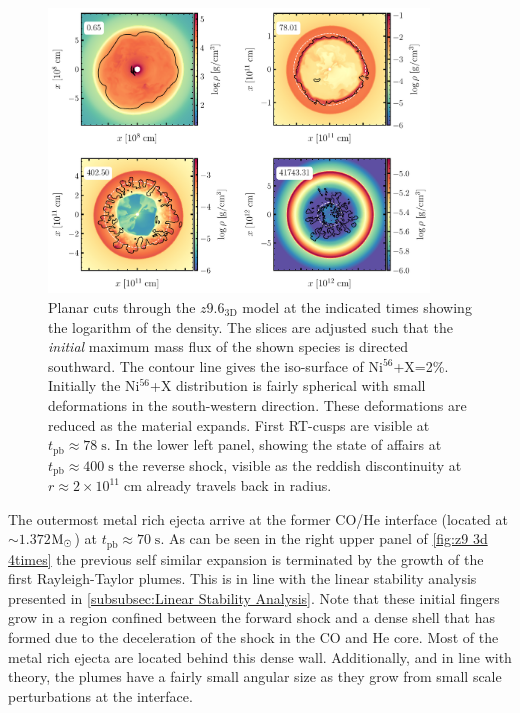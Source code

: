 \documentclass[fleqn,usenatbib]{mnras}
\newcommand{\nickel}{$\mathrm{Ni^{56}}$\xspace}
\newcommand{\tracer}{$\mathrm{X}$\xspace}
\newcommand{\solm}{\xspace\ensuremath{\rm{M_{\odot}}}}
\begin{document}
\fi
\begin{figure}
 \centering
 \includegraphics[width=0.9\textwidth]{pic/rho_cuts_z9_3d_4times.pdf}
 \caption{Planar cuts through the $z9.6_{\mathrm{3D}}$ model at the indicated times showing the logarithm of the density. The slices are adjusted such that the \textit{initial} maximum mass flux of the shown species is directed southward. The contour line gives the iso-surface of \nickel+\tracer=2\%. Initially the \nickel+\tracer distribution is fairly spherical with small deformations in the south-western direction. These deformations are reduced as the material expands. First RT-cusps are visible at $t_{\mathrm{pb}}\approx 78\;\mathrm{s}$. In the lower left panel, showing the state of affairs at  $t_{\mathrm{pb}}\approx 400\;\mathrm{s}$ the reverse shock, visible as the reddish discontinuity at $r\approx 2\times 10^{11}\;\mathrm{cm}$ already travels back in radius. }
 \label{fig:z9 3d 4times}
\end{figure}

The outermost metal rich ejecta arrive at the former CO/He interface (located at $\sim1.372$\solm) at $t_{\mathrm{pb}}\approx 70\;\mathrm{s}$. As can be seen in the right upper panel of \autoref{fig:z9 3d 4times} the previous self similar expansion is terminated by the growth of the first Rayleigh-Taylor plumes. This is in line with the linear stability analysis presented in \autoref{subsubsec:Linear Stability Analysis}. Note that these initial fingers grow in a region confined between the forward shock and a dense shell that has formed due to the deceleration of the shock in the CO and He core. Most of the metal rich ejecta are located behind this dense wall. Additionally, and in line with theory, the plumes have a fairly small angular size as they grow from small scale perturbations at the interface. 
\end{document}
